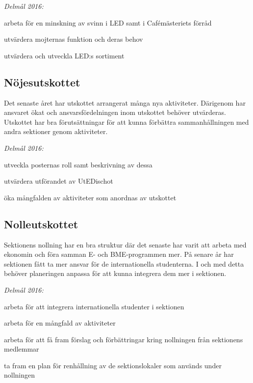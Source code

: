 \documentclass[../_main/handlingar.tex]{subfiles}
\begin{document}
\emph{Delmål 2016:}
\begin{dashlist}
    \item arbeta för en minskning av svinn i LED samt i Cafémästeriets förråd
    \item utvärdera mojternas funktion och deras behov
    \item utvärdera och utveckla LED:s sortiment
\end{dashlist}

\subsection*{Nöjesutskottet}
Det senaste året har utskottet arrangerat många nya aktiviteter. Därigenom har ansvaret ökat och ansvarsfördelningen inom utskottet behöver utvärderas. Utskottet har bra förutsättningar för att kunna förbättra sammanhållningen med andra sektioner genom aktiviteter.

\emph{Delmål 2016:}
\begin{dashlist}
    \item utveckla posternas roll samt beskrivning av dessa
    \item utvärdera utförandet av UtEDischot
    \item öka mångfalden av aktiviteter som anordnas av utskottet
\end{dashlist}

\subsection*{Nolleutskottet}
Sektionens nollning har en bra struktur där det senaste har varit att arbeta med ekonomin och föra samman E- och BME-programmen mer. På senare år har sektionen fått ta mer ansvar för de internationella studenterna. I och med detta behöver planeringen anpassa för att kunna integrera dem mer i sektionen.

\emph{Delmål 2016:}
\begin{dashlist}
    \item arbeta för att integrera internationella studenter i sektionen
    \item arbeta för en mångfald av aktiviteter
    \item arbeta för att få fram förslag och förbättringar kring nollningen från sektionens medlemmar
    \item ta fram en plan för renhållning av de sektionslokaler som används under nollningen
\end{dashlist}
\end{document}
